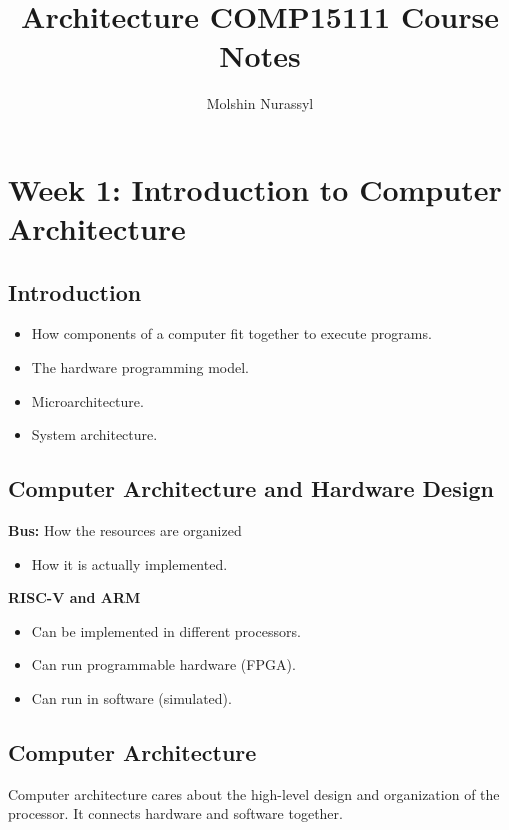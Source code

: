 \documentclass{article}
\title{Architecture COMP15111 Course Notes}
\author{Molshin Nurassyl}
\date{}
\begin{document}
\maketitle

\tableofcontents

\newpage
\section*{Week 1: Introduction to Computer Architecture}

\subsection*{Introduction}
\begin{itemize}
    \item How components of a computer fit together to execute programs.
    \item The hardware programming model.
    \item Microarchitecture.
    \item System architecture.
\end{itemize}

\subsection*{Computer Architecture and Hardware Design}
\textbf{Bus:} How the resources are organized
\begin{itemize}
    \item How it is actually implemented.
\end{itemize}

\textbf{RISC-V and ARM}
\begin{itemize}
    \item Can be implemented in different processors.
    \item Can run programmable hardware (FPGA).
    \item Can run in software (simulated).
\end{itemize}

\subsection*{Computer Architecture}
Computer architecture cares about the high-level design and organization of the processor. It connects hardware and software together.
\end{document}
